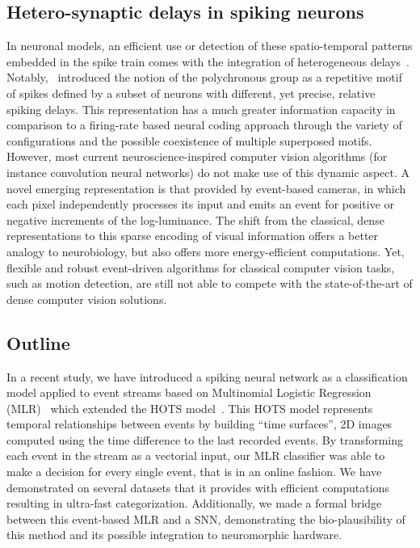 \documentclass[default]{sn-jnl}%
\theoremstyle{thmstyleone}%
\theoremstyle{thmstyletwo}%
\theoremstyle{thmstylethree}%
\begin{document}
\subsection{Hetero-synaptic delays in spiking neurons}
In neuronal models, an efficient use or detection of these spatio-temporal patterns embedded in the spike train comes with the integration of heterogeneous delays~\citep{gutig_tempotron_2006, guise_bayesian_2014, zhang_supervised_2020}. Notably,~\citet{izhikevich_polychronization_2006} introduced the notion of the polychronous group as a repetitive motif of spikes defined by a subset of neurons with different, yet precise, relative spiking delays. This representation has a much greater information capacity in comparison to a firing-rate based neural coding approach through the variety of configurations and the possible coexistence of multiple superposed motifs.
However, most current neuroscience-inspired computer vision algorithms (for instance convolution neural networks) do not make use of this dynamic aspect. A novel emerging representation is that provided by event-based cameras, in which each pixel independently processes its input and emits an event for positive or negative increments of the log-luminance. The shift from the classical, dense representations to this sparse encoding of visual information offers a better analogy to neurobiology, but also offers more energy-efficient computations. Yet, flexible and robust event-driven algorithms for classical computer vision tasks, such as motion detection, are still not able to compete with the state-of-the-art of dense computer vision solutions.

\subsection{Outline}

In a recent study, we have introduced a spiking neural network as a classification model applied to event streams based on Multinomial Logistic Regression (MLR)~\citep{grimaldi_robust_2022} which extended the HOTS model~\citet{lagorce_hots_2017}. This HOTS model represents temporal relationships between events by building ``time surfaces'', 2D images computed using the time difference to the last recorded events. By transforming each event in the stream as a vectorial input, our MLR classifier was able to make a decision for every single event, that is in an online fashion. We have demonstrated on several datasets that it provides with efficient computations resulting in ultra-fast categorization. Additionally, we made a formal bridge between this event-based MLR and a SNN, demonstrating the bio-plausibility of this method and its possible integration to neuromorphic hardware.
\end{document}
